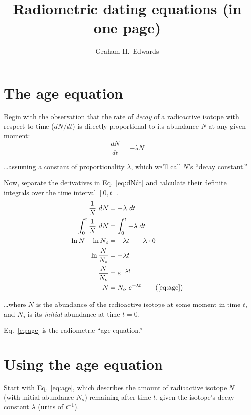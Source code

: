 \documentclass[12pt, letterpaper,twocolumn]{article}
\title{
    Radiometric dating equations %
    (in one page) \vspace*{-1ex}}\date{\vspace*{-6ex}}
\author{
    Graham H.~Edwards %
    }
\begin{document}
\maketitle \thispagestyle{empty}

\section{The age equation}

Begin with the observation that the rate of \emph{decay} of a radioactive isotope with respect to time ($dN/dt$) is directly proportional to its abundance $N$ at any given moment:
\begin{equation}\label{eq:dNdt}
    \frac{dN}{dt} = -\lambda N
\end{equation}

\dots assuming a constant of proportionality $\lambda$, which we'll call $N$'s ``decay constant.''

Now, separate the derivatives in Eq.~\ref{eq:dNdt} and calculate their definite integrals over the time interval $\left[0,t\right]$.
\begin{subequations}\label{eq:age}
    \begin{align*}
        \frac{1}{N}~dN &= -\lambda~dt
        \\
        \int_0^t \frac{1}{N}~dN & = \int_0^t -\lambda~dt
        \\
        \ln N - \ln N_o &= -\lambda t - -\lambda \cdot 0
        \\
        \ln \frac{N}{N_o} &= -\lambda t
        \\
        \frac{N}{N_o} &= e^{-\lambda t}
        \\
        N &= N_o~e^{-\lambda t} \tag{\ref{eq:age}}
    \end{align*}
\end{subequations}

\dots where $N$ is the abundance of the radioactive isotope at some moment in time $t$, and $N_o$ is its \emph{initial} abundance at time $t=0$.

Eq.~\ref{eq:age} is the radiometric ``age equation.''

\section{Using the age equation}
Start with Eq.~\ref{eq:age}, which describes the amount of radioactive isotope $N$ (with initial abundance $N_o$) remaining after time $t$, given the isotope's decay constant $\lambda$ (units of $t^{-1}$).
\end{document}
